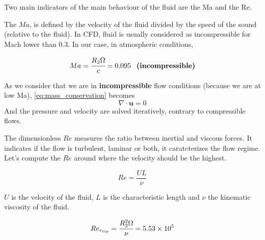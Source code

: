 Two main indicators of the main behaviour of the fluid are the \ac{Ma} and the \ac{Re}.

The $Ma$, is defined by the velocity of the fluid divided by the speed of the sound (relative to the fluid). In CFD, fluid is usually considered as incompressible for Mach lower than 0.3.
In our case, in atmospheric conditions,

\begin{equation}
    Ma = \cfrac{R_2 \Omega}{c} = 0.095 \phantom{-} \textrm{\textbf{(incompressible)}}
\end{equation}

As we consider that we are in \textbf{incompressible} flow conditions (because we are at low Ma), \autoref{eq:mass_conservation} becomes
\begin{equation}
    \nabla \cdot \mathbf{u} = 0
\end{equation}
And the pressure and velocity are solved iteratively, contrary to compressible flows.

The dimensionless $Re$ measures the ratio between inertial and viscous forces. It indicates if the flow is turbulent, laminar or both, it caratcterizes the flow regime. 
Let's compute the $Re$ around where the velocity should be the highest.

\begin{equation}
    Re = \frac{UL}{\nu}
\end{equation}

$U$ is the velocity of the fluid, $L$ is the characteristic length and $\nu$ the kinematic viscosity of the fluid.

\begin{equation}
    Re_{r_{tip}}=\cfrac{R_2^2 \Omega}{\nu} = 5.53\times10^5
\end{equation}




